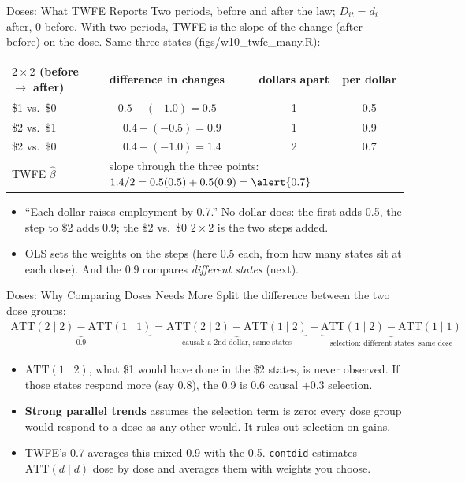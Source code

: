 \documentclass[aspectratio=169,11pt,xcolor=dvipsnames]{beamer}
\newcommand{\srcp}[1]{{\scriptsize\color{gray}(#1)}}
\begin{document}
\begin{frame}{Doses: What TWFE Reports}
Two periods, before and after the law; $D_{it} = d_i$ after, 0 before. With two periods, TWFE
is the slope of the change (after $-$ before) on the dose. Same three states \srcp{figs/w10\_twfe\_many.R}:
\vskip1pt
\begin{center}\small
\renewcommand{\arraystretch}{1.15}
\begin{tabular}{@{}llcc@{}}
\toprule
$2\times2$ (before $\to$ after) & difference in changes & dollars apart & per dollar \\
\midrule
\$1 vs.\ \$0 & $-0.5 - (-1.0) = 0.5$ & 1 & 0.5 \\
\$2 vs.\ \$1 & $\phantom{-}0.4 - (-0.5) = 0.9$ & 1 & 0.9 \\
\$2 vs.\ \$0 & $\phantom{-}0.4 - (-1.0) = 1.4$ & 2 & 0.7 \\
\midrule
TWFE $\hat\beta$ & \multicolumn{3}{l}{slope through the three points: $1.4/2 = 0.5(0.5) + 0.5(0.9) = \alert{0.7}$} \\
\bottomrule
\end{tabular}
\end{center}
\vskip3pt
\begin{itemize}\itemsep2pt
  \item ``Each dollar raises employment by 0.7.'' No dollar does: the first adds 0.5, the step
        to \$2 adds 0.9; the \$2 vs.\ \$0 $2\times2$ is the two steps added.
  \item OLS sets the weights on the steps (here 0.5 each, from how many states sit at each dose).
        And the 0.9 compares \emph{different states} (next).
\end{itemize}
\end{frame}

\begin{frame}{Doses: Why Comparing Doses Needs More}
Split the difference between the two dose groups:
\begin{align*}
  \underbrace{\text{ATT}(2\mid 2) - \text{ATT}(1\mid 1)}_{0.9}
  = \underbrace{\text{ATT}(2\mid 2) - \text{ATT}(1\mid 2)}_{\text{causal: a 2nd dollar, same states}}
  + \underbrace{\text{ATT}(1\mid 2) - \text{ATT}(1\mid 1)}_{\text{selection: different states, same dose}}
\end{align*}
\begin{itemize}\itemsep4pt
  \item $\text{ATT}(1 \mid 2)$, what \$1 would have done in the \$2 states, is never observed.
        If those states respond more (say 0.8), the 0.9 is $0.6$ causal $+ 0.3$ selection.
  \item \textbf{Strong parallel trends} assumes the selection term is zero: every dose group
        would respond to a dose as any other would. It rules out selection on gains.
  \item TWFE's 0.7 averages this mixed 0.9 with the 0.5. \texttt{contdid} estimates
        $\text{ATT}(d \mid d)$ dose by dose and averages them with weights you choose.
\end{itemize}
\end{frame}
\end{document}
